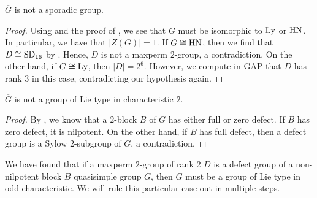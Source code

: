 \documentclass[bysection, amsart]{standard}
\begin{document}
\begin{lemma}
    $\overline{G}$ is not a sporadic group.
\end{lemma}
\begin{proof}
    Using \cite[Table 2]{paper:nilpotent-abelian-2} and the proof of \cite[Proposition 4.1]{paper:nilpotent-abelian-2}, we see that $\overline{G}$ must be isomorphic to $\operatorname{Ly}$ or $\operatorname{HN}$. In particular, we have that $|Z(G)| = 1$. If $G \cong \operatorname{HN}$, then we find that $D \cong \operatorname{SD}_{16}$ by \cite[Table 10]{paper:awc}. Hence, $D$ is not a maxperm $2$-group, a contradiction. On the other hand, if $G \cong \operatorname{Ly}$, then $|D| = 2^6$. However, we compute in GAP that $D$ has rank $3$ in this case, contradicting our hypothesis again.
\end{proof}

\begin{lemma}
    $\overline{G}$ is not a group of Lie type in characteristic $2$.
\end{lemma}
\begin{proof}
    By \cite{paper:def-char}, we know that a $2$-block $B$ of $G$ has either full or zero defect. If $B$ has zero defect, it is nilpotent. On the other hand, if $B$ has full defect, then a defect group is a Sylow $2$-subgroup of $G$, a contradiction.
\end{proof}

We have found that if a maxperm $2$-group of rank $2$ $D$ is a defect group of a non-nilpotent block $B$ quasisimple group $G$, then $G$ must be a group of Lie type in odd characteristic. We will rule this particular case out in multiple steps.
\end{document}

